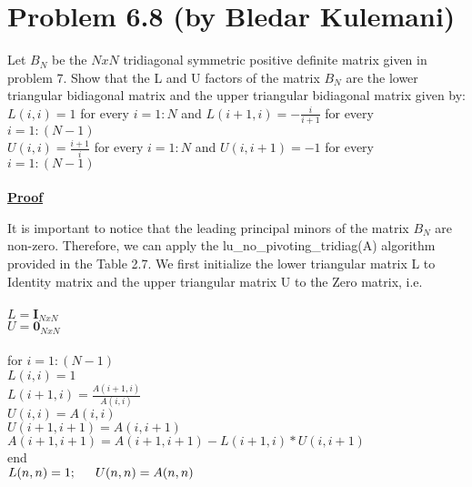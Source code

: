 \documentclass{article}
\DeclareMathOperator{\1}{\mathit{1}}
\numberwithin{figure}{section} %
\numberwithin{table}{section}
\begin{document}
\newpage{}
\section {Problem 6.8 (by Bledar Kulemani)} 
\par Let \(B_N\) be the \(NxN\) tridiagonal symmetric positive definite matrix given in problem 7. Show that the L and U factors of the matrix  \(B_N\) are the lower triangular bidiagonal matrix and the upper triangular bidiagonal matrix given by:\\
\indent \(L(i,i) = 1\) for every \(i=1:N\) and \(L(i+1,i) = -\frac{i}{i+1}\) for every \(i=1:(N-1)\)\\ 
\indent\(U(i,i) = \frac{i+1}{i}\) for every \(i=1:N\) and \(U(i,i+1) = -1\) for every \(i=1:(N-1)\)\\\\
\underline{\textbf {Proof}} 
\par It is important to notice that the leading principal minors of the matrix \(B_N\) are non-zero. Therefore, we can apply the lu\_no\_pivoting\_tridiag(A) algorithm provided in the Table 2.7. We first initialize the lower triangular matrix L to Identity matrix and the upper triangular matrix U to the Zero matrix, i.e.\\\\
\indent \hspace{5 cm} \(L=\textbf{I}_{NxN}\)\\
\indent \hspace{5 cm} \(U=\textbf{0}_{NxN}\)\\\\
\indent \hspace{5 cm}for \(i=1:(N-1)\)\\
\indent \hspace{5 cm} \indent \(L(i,i) = 1\)\\
\indent \hspace{5 cm} \indent \(L(i+1,i) = \frac{A(i+1,i)}{A(i,i)}\)\\
\indent \hspace{5 cm} \indent \(U(i,i) = A(i,i)\)\\
\indent \hspace{5 cm} \indent \(U(i+1,i+1) = A(i,i+1)\)\\
\indent \hspace{5 cm} \indent \(A(i+1,i+1) = A(i+1,i+1)-L(i+1,i)*U(i,i+1)\)\\
\indent \hspace{5 cm} end\\
\indent \hspace{5 cm} \(L(n,n) = 1; \indent U(n,n) = A(n,n)\)\\\\
\end{document}
